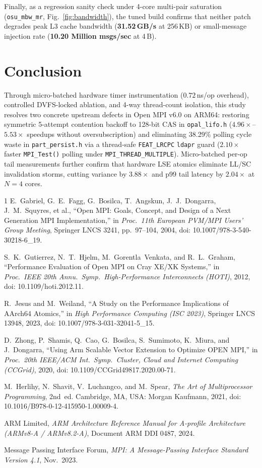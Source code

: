 \documentclass[conference]{IEEEtran}
\begin{document}
Finally, as a regression sanity check under 4-core multi-pair saturation (\texttt{osu\_mbw\_mr}, Fig.~\ref{fig:bandwidth}), the tuned build confirms that neither patch degrades peak L3 cache bandwidth (\textbf{31.52\,GB/s} at 256\,KB) or small-message injection rate (\textbf{10.20 Million msgs/sec} at 4\,B).

\section{Conclusion}
Through micro-batched hardware timer instrumentation ($0.72$\,ns/op overhead), controlled DVFS-locked ablation, and 4-way thread-count isolation, this study resolves two concrete upstream defects in Open MPI v6.0 on ARM64: restoring symmetric 5-attempt contention backoff to 128-bit CAS in \texttt{opal\_lifo.h} ($4.96\times$--$5.53\times$ speedups without oversubscription) and eliminating 38.29\% polling cycle waste in \texttt{part\_persist.h} via a thread-safe \texttt{FEAT\_LRCPC} \texttt{ldapr} guard ($2.10\times$ faster \texttt{MPI\_Test()} polling under \texttt{MPI\_THREAD\_MULTIPLE}). Micro-batched per-op tail measurements further confirm that hardware LSE atomics eliminate LL/SC invalidation storms, cutting variance by $3.88\times$ and p99 tail latency by $2.04\times$ at $N=4$ cores.

\FloatBarrier
\begin{thebibliography}{1}
E.~Gabriel, G.~E.~Fagg, G.~Bosilca, T.~Angskun, J.~J.~Dongarra, J.~M.~Squyres, et al., ``Open MPI: Goals, Concept, and Design of a Next Generation MPI Implementation,'' in \emph{Proc.\ 11th European PVM/MPI Users' Group Meeting}, Springer LNCS 3241, pp.~97--104, 2004, doi: 10.1007/978-3-540-30218-6\_19.

S.~K.~Gutierrez, N.~T.~Hjelm, M.~Gorentla~Venkata, and R.~L.~Graham, ``Performance Evaluation of Open MPI on Cray XE/XK Systems,'' in \emph{Proc.\ IEEE 20th Annu.\ Symp.\ High-Performance Interconnects (HOTI)}, 2012, doi: 10.1109/hoti.2012.11.

R.~Jesus and M.~Weiland, ``A Study on the Performance Implications of AArch64 Atomics,'' in \emph{High Performance Computing (ISC 2023)}, Springer LNCS 13948, 2023, doi: 10.1007/978-3-031-32041-5\_15.

D.~Zhong, P.~Shamis, Q.~Cao, G.~Bosilca, S.~Sumimoto, K.~Miura, and J.~Dongarra, ``Using Arm Scalable Vector Extension to Optimize OPEN MPI,'' in \emph{Proc.\ 20th IEEE/ACM Int.\ Symp.\ Cluster, Cloud and Internet Computing (CCGrid)}, 2020, doi: 10.1109/CCGrid49817.2020.00-71.

M.~Herlihy, N.~Shavit, V.~Luchangco, and M.~Spear, \emph{The Art of Multiprocessor Programming}, 2nd~ed. Cambridge, MA, USA: Morgan Kaufmann, 2021, doi: 10.1016/B978-0-12-415950-1.00009-4.

ARM Limited, \emph{ARM Architecture Reference Manual for A-profile Architecture (ARMv8-A / ARMv8.2-A)}, Document ARM DDI 0487, 2024.

Message Passing Interface Forum, \emph{MPI: A Message-Passing Interface Standard Version 4.1}, Nov.\ 2023.
\end{thebibliography}
\end{document}
